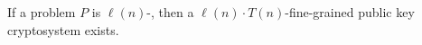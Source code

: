 \begin{theorem}\label{thm:CryptoSystemKeyExchangeReady}
	 If a problem $P$ is $\ell(n)$-\keyER, then a $\ell(n) \cdot T(n)$-fine-grained public key cryptosystem exists.
\end{theorem}

